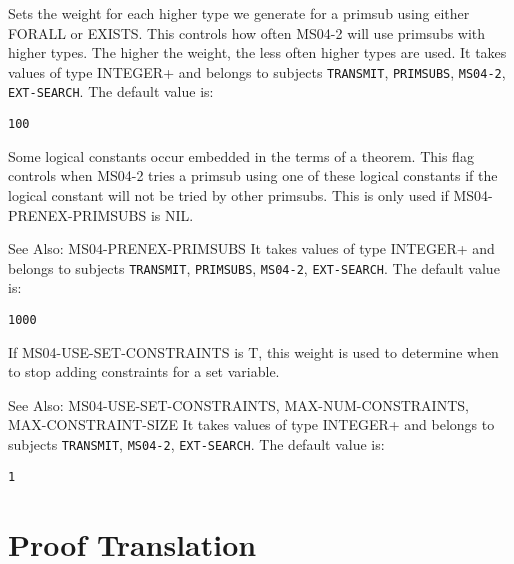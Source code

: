 \begin{description}
\item[MS04-WEIGHT-PRIMSUB-NEXTTP]  
Sets the weight for each higher type we generate for a primsub using
either FORALL or EXISTS.  This controls how often MS04-2 will use
primsubs with higher types.  The higher the weight, the less often
higher types are used.
It takes values of type INTEGER+ and belongs to subjects \texttt{TRANSMIT}, \texttt{PRIMSUBS}, \texttt{MS04-2}, \texttt{EXT-SEARCH}.  The default value is: \begin{lstlisting}
100
\end{lstlisting}

\item[MS04-WEIGHT-PRIMSUB-OCCURS-CONST]  
Some logical constants occur embedded in the terms of a theorem.
This flag controls when MS04-2 tries a primsub using one of these logical constants
if the logical constant will not be tried by other primsubs.
This is only used if MS04-PRENEX-PRIMSUBS is NIL.

See Also: MS04-PRENEX-PRIMSUBS
It takes values of type INTEGER+ and belongs to subjects \texttt{TRANSMIT}, \texttt{PRIMSUBS}, \texttt{MS04-2}, \texttt{EXT-SEARCH}.  The default value is: \begin{lstlisting}
1000
\end{lstlisting}

\item[MS04-WEIGHT-SOLVE-SET-CONSTRAINTS]  
If MS04-USE-SET-CONSTRAINTS is T, this weight is used to determine
when to stop adding constraints for a set variable.

See Also: MS04-USE-SET-CONSTRAINTS, MAX-NUM-CONSTRAINTS, MAX-CONSTRAINT-SIZE
It takes values of type INTEGER+ and belongs to subjects \texttt{TRANSMIT}, \texttt{MS04-2}, \texttt{EXT-SEARCH}.  The default value is: \begin{lstlisting}
1
\end{lstlisting}

\item
\end{description}

\section{Proof Translation}

